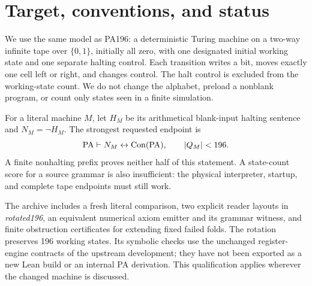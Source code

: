 \begin{abstract}
The strict target of this investigation is a binary, single-tape machine
with fewer than 196 working states whose blank-tape nonhalting is equivalent
to the consistency of ordinary first-order Peano arithmetic. No such machine
is established here. We compare the literal 208-, 209-, and 196-state
constructions, provide two new explicit 196-state reader layouts with complete
startup and executable symbolic checks, and give small certificates excluding
specified repairs of five earlier near misses. A new equivalent axiom emitter
uses 199 macro tokens and 3,773 primitive instructions instead of 201 and
3,812, with a uniform proof-translation argument verifiable in PA. An explicit
67-rule grammar is supplied; its shortest verified tape implementation here
has 198 states and does not meet the target. A new source search permits jump depths to change while
preserving the exact ordinal control graph.
We distinguish these results from a smaller-machine construction and from
an exported PA proof of the full consistency biconditional.
\end{abstract}

\section{Target, conventions, and status}

We use the same model as PA196: a deterministic Turing machine on a two-way
infinite tape over $\{0,1\}$, initially all zero, with one designated initial
working state and one separate halting control. Each transition writes a bit,
moves exactly one cell left or right, and changes control. The halt control
is excluded from the working-state count. We do not change the alphabet,
preload a nonblank program, or count only states seen in a finite simulation.

For a literal machine $M$, let $H_M$ be its arithmetical blank-input halting
sentence and $N_M=\neg H_M$. The strongest requested endpoint is
\[
 \mathrm{PA}\vdash N_M\leftrightarrow\operatorname{Con}(\mathrm{PA}),\qquad |Q_M|<196.
\]
A finite nonhalting prefix proves neither half of this statement. A
state-count score for a source grammar is also insufficient: the physical
interpreter, startup, and complete tape endpoints must still work.

The archive includes a fresh literal comparison, two explicit reader layouts
in \emph{rotated196}, an equivalent numerical axiom emitter and its grammar
witness, and finite obstruction certificates for extending fixed failed folds. The
rotation preserves 196 working states. Its symbolic checks use the
unchanged register-engine contracts of the upstream development; they have
not been exported as a new Lean build or an internal PA derivation.
This qualification applies wherever the changed machine is discussed.

